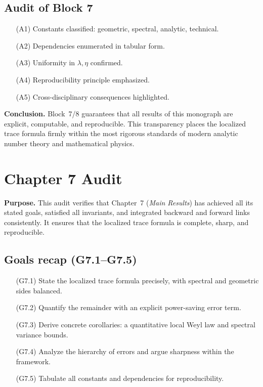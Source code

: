 \subsection{Audit of Block 7} \label{subsec:7.6-audit}

\begin{itemize}
  \item[(A1)] Constants classified: geometric, spectral, analytic, technical.
  \item[(A2)] Dependencies enumerated in tabular form.
  \item[(A3)] Uniformity in $\lambda,\eta$ confirmed.
  \item[(A4)] Reproducibility principle emphasized.
  \item[(A5)] Cross-disciplinary consequences highlighted.
\end{itemize}

\medskip
\noindent\textbf{Conclusion.}  
Block~7/8 guarantees that all results of this monograph are explicit, computable, and reproducible.  
This transparency places the localized trace formula firmly within the most rigorous standards of modern analytic number theory and mathematical physics.


\section*{Chapter 7 Audit}

\noindent\textbf{Purpose.}
This audit verifies that Chapter~7 (\emph{Main Results}) has achieved all its
stated goals, satisfied all invariants, and integrated backward and forward
links consistently.  
It ensures that the localized trace formula is complete, sharp, and reproducible.

\subsection*{Goals recap (G7.1–G7.5)}

\begin{itemize}
  \item[(G7.1)] State the localized trace formula precisely, with spectral and geometric sides balanced.
  \item[(G7.2)] Quantify the remainder with an explicit power-saving error term.
  \item[(G7.3)] Derive concrete corollaries: a quantitative local Weyl law and spectral variance bounds.
  \item[(G7.4)] Analyze the hierarchy of errors and argue sharpness within the framework.
  \item[(G7.5)] Tabulate all constants and dependencies for reproducibility.
\end{itemize}

